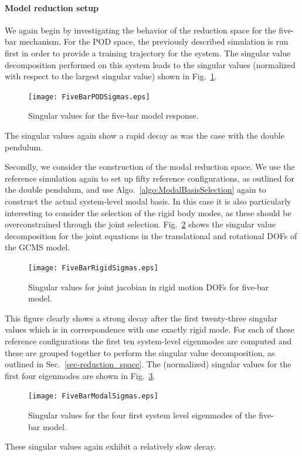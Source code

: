 \paragraph{Model reduction setup}
We again begin by investigating the behavior of the reduction space for the five-bar mechanism. For the POD space, the previously described simulation is run first in order to provide a training trajectory for the system. The singular value decomposition performed on this system leads to the singular values (normalized with respect to the largest singular value) shown in Fig.~\ref{fig:FiveBarSigmas}.
\begin{figure}[htp]
\centering
\texttt{[image: FiveBarPODSigmas.eps]} 
\caption{Singular values for the five-bar model response.}
\label{fig:FiveBarSigmas}
\end{figure}
The singular values again show a rapid decay as was the case with the double pendulum.  

Secondly, we consider the construction of the modal reduction space. We use the reference simulation again to set up fifty reference configurations, as outlined for the double pendulum, and use Algo.~\ref{algo:ModalBasisSelection} again to construct the actual system-level modal basis. 
In this case it is also particularly interesting to consider the selection of the rigid body modes, as these should be overconstrained through the joint selection. Fig.~\ref{fig:FiveBarRigidSigmas} shows the singular value decomposition for the joint equations in the translational and rotational DOFs of the GCMS model. 
\begin{figure}[htp]
\centering
\texttt{[image: FiveBarRigidSigmas.eps]} 
\caption{Singular values for joint jacobian in rigid motion DOFs for five-bar model.}
\label{fig:FiveBarRigidSigmas}
\end{figure}
This figure clearly shows a strong decay after the first twenty-three singular values which is in correspondence with one exactly rigid mode. 
For each of these reference configurations the first ten system-level eigenmodes are computed and these are grouped together to perform the singular value decomposition, as outlined in Sec.~\ref{sec-reduction_space}. The (normalized) singular values for the first four eigenmodes are shown in Fig.~\ref{fig:FiveBarModalSigmas}.
\begin{figure}[htp]
\centering
\texttt{[image: FiveBarModalSigmas.eps]} 
\caption{Singular values for the four first system level eigenmodes of the five-bar model.}
\label{fig:FiveBarModalSigmas}
\end{figure}
These singular values again exhibit a relatively slow decay. 


